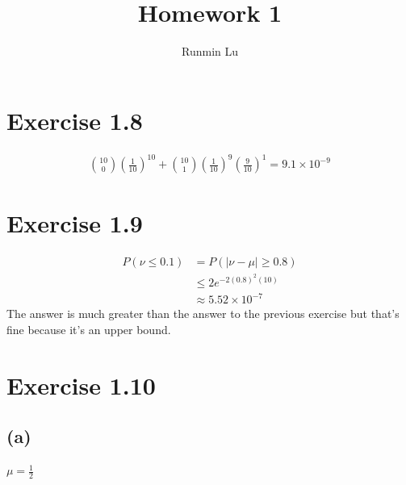 \documentclass{article}
\title{Homework 1}
\author{Runmin Lu}
\begin{document}
	\maketitle
	
	\section*{Exercise 1.8}
		\begin{align*}
			{10 \choose 0} (\frac1{10})^{10} + {10 \choose 1} (\frac1{10})^9(\frac9{10})^1 = \boxed{9.1 \times 10^{-9}}
		\end{align*}

	\section*{Exercise 1.9}
		\begin{align*}
			P(\nu \leq 0.1) &= P(|\nu - \mu| \geq 0.8)\\
			&\leq 2e^{-2(0.8)^2(10)}\\
			&\approx \boxed{5.52 \times 10^{-7}}
		\end{align*}
		The answer is much greater than the answer to the previous exercise but that's fine because it's an upper bound.
		
	\section*{Exercise 1.10}
	\subsection*{(a)}
		$\mu = \frac12$
\end{document}
